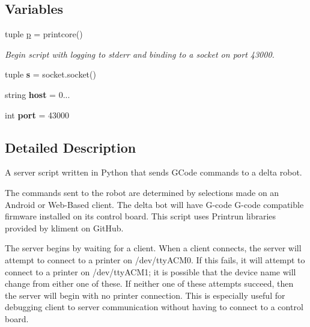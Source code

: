 \subsection*{Variables}
\begin{DoxyCompactItemize}
\item 
tuple \hyperlink{namespacepy_delta_server_a9f57f27f471bef1c4947e6e03b515430}{p} = printcore()
\begin{DoxyCompactList}\small\item\em Begin script with logging to stderr and binding to a socket on port 43000. \end{DoxyCompactList}\item 
\hypertarget{namespacepy_delta_server_a882b3575b268133fed6416e13b268c88}{}tuple {\bfseries s} = socket.\+socket()\label{namespacepy_delta_server_a882b3575b268133fed6416e13b268c88}

\item 
\hypertarget{namespacepy_delta_server_a39fc5b159aee4d88b7c94a9928c6bc82}{}string {\bfseries host} = \textquotesingle{}0...\textquotesingle{}\label{namespacepy_delta_server_a39fc5b159aee4d88b7c94a9928c6bc82}

\item 
\hypertarget{namespacepy_delta_server_ae9b0174d8630e9df876a3507ec25c656}{}int {\bfseries port} = 43000\label{namespacepy_delta_server_ae9b0174d8630e9df876a3507ec25c656}

\end{DoxyCompactItemize}


\subsection{Detailed Description}
A server script written in Python that sends G\+Code commands to a delta robot. 

The commands sent to the robot are determined by selections made on an Android or Web-\/\+Based client. The delta bot will have G-\/code G-\/code compatible firmware installed on its control board. This script uses Printrun libraries provided by kliment on Git\+Hub.

The server begins by waiting for a client. When a client connects, the server will attempt to connect to a printer on /dev/tty\+A\+C\+M0. If this fails, it will attempt to connect to a printer on /dev/tty\+A\+C\+M1; it is possible that the device name will change from either one of these. If neither one of these attempts succeed, then the server will begin with no printer connection. This is especially useful for debugging client to server communication without having to connect to a control board.

